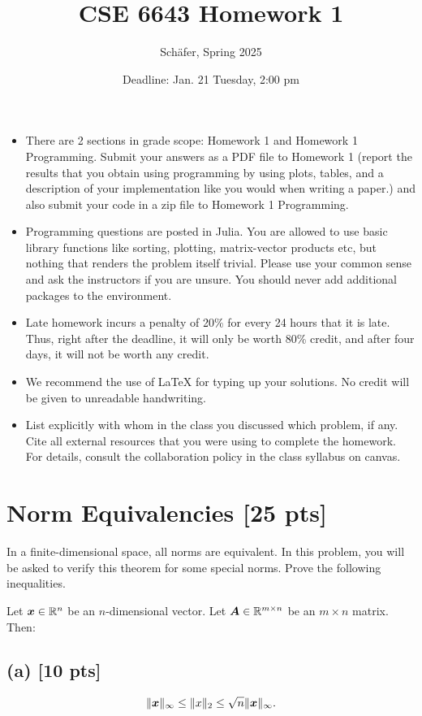 \documentclass[twoside,10pt]{article}
\begin{document}
\title{CSE 6643 Homework 1}
\author{Sch{\"a}fer, Spring 2025}
\date{Deadline: Jan. 21 Tuesday, 2:00 pm}
\maketitle

\begin{itemize}
  \item There are 2 sections in grade scope: Homework 1 and Homework 1 Programming. Submit your answers as a PDF file to Homework 1 (report the results that you obtain using programming by using plots, tables, and a description of your implementation like you would when writing a paper.) and also submit your code in a zip file to Homework 1 Programming. 
  \item Programming questions are posted in Julia. You are allowed to use basic library functions like sorting, plotting, matrix-vector products etc, but nothing that renders the problem itself trivial. Please use your common sense and ask the instructors if you are unsure. 
  You should never add additional packages to the environment.
  \item Late homework incurs a penalty of 20\% for every 24 hours that it is late. Thus, right after the deadline, it will only be worth 80\% credit, and after four days, it will not be worth any credit. 
  \item We recommend the use of LaTeX for typing up your solutions. No credit will be given to unreadable handwriting.
  \item List explicitly with whom in the class you discussed which problem, if any. Cite all external resources that you were using to complete the homework. For details, consult the collaboration policy in the class syllabus on canvas.
\end{itemize}

\section{Norm Equivalencies [25 pts]}
In a finite-dimensional space, all norms are equivalent. In this problem, you will be asked to verify this theorem for some special norms. Prove the following inequalities. 

Let $\bm{x} \in \mathbb{R}^n$ be an $n$-dimensional vector. Let $\bm{A} \in \mathbb{R}^{m \times n}$ be an $m \times n$ matrix. Then: 

\subsection*{(a) [10 pts]}
\begin{equation*}
  \|\bm{x}\|_{\infty} \leq \|x\|_2 \leq \sqrt{n}\|\bm{x}\|_{\infty}.
\end{equation*}
\end{document}
